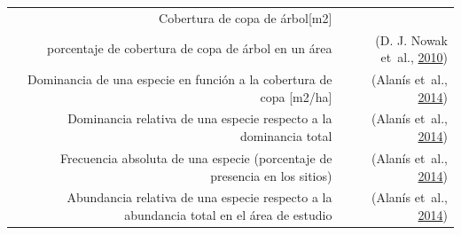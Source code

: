 \documentclass[12pt,a4paper,openany]{book}
\theoremstyle{definition}
\theoremstyle{definition}
\theoremstyle{definition}
\theoremstyle{remark}
\begin{document}
\begin{longtable}[]{@{}rr@{}}
\begin{minipage}[t]{0.57\columnwidth}
Cobertura de copa de árbol{[}m2{]}\strut
\end{minipage} & \begin{minipage}[t]{0.31\columnwidth}\raggedleft\strut
\strut
\end{minipage}\tabularnewline
\begin{minipage}[t]{0.57\columnwidth}\raggedleft\strut
porcentaje de cobertura de copa de árbol en un área\strut
\end{minipage} & \begin{minipage}[t]{0.31\columnwidth}\raggedleft\strut
(D. J. Nowak et~al.,
\protect\hyperlink{ref-nowak_sustaining_2010}{2010})\strut
\end{minipage}\tabularnewline
\begin{minipage}[t]{0.57\columnwidth}\raggedleft\strut
Dominancia de una especie en función a la cobertura de copa
{[}m2/ha{]}\strut
\end{minipage} & \begin{minipage}[t]{0.31\columnwidth}\raggedleft\strut
(Alanís et~al.,
\protect\hyperlink{ref-alanis_estructura_2014}{2014})\strut
\end{minipage}\tabularnewline
\begin{minipage}[t]{0.57\columnwidth}\raggedleft\strut
Dominancia relativa de una especie respecto a la dominancia total\strut
\end{minipage} & \begin{minipage}[t]{0.31\columnwidth}\raggedleft\strut
(Alanís et~al.,
\protect\hyperlink{ref-alanis_estructura_2014}{2014})\strut
\end{minipage}\tabularnewline
\begin{minipage}[t]{0.57\columnwidth}\raggedleft\strut
Frecuencia absoluta de una especie (porcentaje de presencia en los
sitios)\strut
\end{minipage} & \begin{minipage}[t]{0.31\columnwidth}\raggedleft\strut
(Alanís et~al.,
\protect\hyperlink{ref-alanis_estructura_2014}{2014})\strut
\end{minipage}\tabularnewline
\begin{minipage}[t]{0.57\columnwidth}\raggedleft\strut
Abundancia relativa de una especie respecto a la abundancia total en el
área de estudio\strut
\end{minipage} & \begin{minipage}[t]{0.31\columnwidth}\raggedleft\strut
(Alanís et~al.,
\protect\hyperlink{ref-alanis_estructura_2014}{2014})\strut
\end{minipage}\tabularnewline

\end{longtable}
\end{document}
